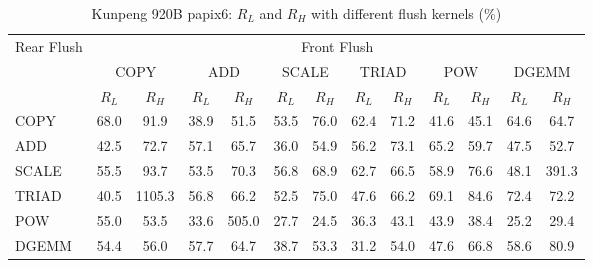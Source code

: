 \begin{table}[htbp]
\centering
\caption{Kunpeng 920B papix6: $R_L$ and $R_H$ with different flush kernels (\%)}
\label{tab:frkern-c920bn3-papix6}
\begin{tabular*}{\textwidth}{@{\extracolsep{\fill}}lcccccccccccc}
\toprule
\multirow{3}{*}{Rear Flush} & \multicolumn{12}{c}{Front Flush} \\ \cmidrule(lr){2-13}
& \multicolumn{2}{c}{COPY} & \multicolumn{2}{c}{ADD} & \multicolumn{2}{c}{SCALE} & \multicolumn{2}{c}{TRIAD} & \multicolumn{2}{c}{POW} & \multicolumn{2}{c}{DGEMM} \\ \cmidrule(lr){2-3} \cmidrule(lr){4-5} \cmidrule(lr){6-7} \cmidrule(lr){8-9} \cmidrule(lr){10-11} \cmidrule(lr){12-13}
& $R_L$ & $R_H$ & $R_L$ & $R_H$ & $R_L$ & $R_H$ & $R_L$ & $R_H$ & $R_L$ & $R_H$ & $R_L$ & $R_H$ \\ \midrule
COPY & 68.0 & 91.9 & 38.9 & 51.5 & 53.5 & 76.0 & 62.4 & 71.2 & 41.6 & 45.1 & 64.6 & 64.7 \\
ADD & 42.5 & 72.7 & 57.1 & 65.7 & 36.0 & 54.9 & 56.2 & 73.1 & 65.2 & 59.7 & 47.5 & 52.7 \\
SCALE & 55.5 & 93.7 & 53.5 & 70.3 & 56.8 & 68.9 & 62.7 & 66.5 & 58.9 & 76.6 & 48.1 & 391.3 \\
TRIAD & 40.5 & 1105.3 & 56.8 & 66.2 & 52.5 & 75.0 & 47.6 & 66.2 & 69.1 & 84.6 & 72.4 & 72.2 \\
POW & 55.0 & 53.5 & 33.6 & 505.0 & 27.7 & 24.5 & 36.3 & 43.1 & 43.9 & 38.4 & 25.2 & 29.4 \\
DGEMM & 54.4 & 56.0 & 57.7 & 64.7 & 38.7 & 53.3 & 31.2 & 54.0 & 47.6 & 66.8 & 58.6 & 80.9 \\
\bottomrule
\end{tabular*}
\end{table}